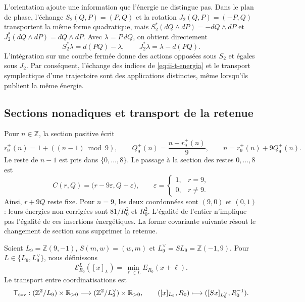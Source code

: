 L’orientation ajoute une information que l’énergie ne distingue pas. Dans le plan
de phase, l’échange \(S_2(Q,P)=(P,Q)\) et la rotation
\(J_2(Q,P)=(-P,Q)\) transportent la même forme quadratique, mais
\(S_2^*(dQ\wedge dP)=-dQ\wedge dP\) et
\(J_2^*(dQ\wedge dP)=dQ\wedge dP\). Avec
\(\lambda=P\,dQ\), on obtient directement
\[
 S_2^*\lambda=d(PQ)-\lambda,\qquad
 J_2^*\lambda=\lambda-d(PQ).
\]
L’intégration sur une courbe fermée donne des actions opposées sous \(S_2\)
et égales sous \(J_2\). Par conséquent, l’échange des indices de
\eqref{eq:ii-t-energia} et le transport symplectique d’une trajectoire
sont des applications distinctes, même lorsqu’ils publient la même énergie.

\subsection{Sections nonadiques et transport de la retenue}

Pour \(n\in\mathbb Z\), la section positive écrit
\[
 r_9^+(n)=1+((n-1)\bmod9),\qquad
 Q_9^+(n)=\frac{n-r_9^+(n)}9,\qquad n=r_9^+(n)+9Q_9^+(n).
\]
Le reste de \(n-1\) est pris dans \(\{0,\ldots,8\}\). Le passage à
la section des restes \(0,\ldots,8\) est
\begin{equation}
 C(r,Q)=\bigl(r-9\varepsilon,Q+\varepsilon\bigr),\qquad
 \varepsilon=\begin{cases}1,&r=9,\\0,&r\ne9.\end{cases}
 \label{eq:ii-t-acarreo}
\end{equation}
Ainsi, \(r+9Q\) reste fixe. Pour \(n=9\), les deux coordonnées
sont \((9,0)\) et \((0,1)\) : leurs énergies non corrigées sont
\(81/R_0^2\) et \(R_0^2\). L’égalité de l’entier n’implique pas
l’égalité de ces insertions énergétiques. La forme covariante suivante
résout le changement de section sans supprimer la retenue.

\begin{definition}
\label{def:ii-t-cociente}
Soient \(L_9=\mathbb Z(9,-1)\), \(S(m,w)=(w,m)\) et
\(L_9^\vee=SL_9=\mathbb Z(-1,9)\). Pour
\(L\in\{L_9,L_9^\vee\}\), nous définissons
\[
 \mathcal E_{R_0}^{L}([x]_L)
 =\min_{\ell\in L}E_{R_0}(x+\ell).
\]
Le transport entre coordinatisations est
\[
 \mathsf T_{\rm cov}:
 (\mathbb Z^2/L_9)\times\mathbb R_{>0}
 \longrightarrow
 (\mathbb Z^2/L_9^\vee)\times\mathbb R_{>0},\qquad
 ([x]_{L_9},R_0)\longmapsto([Sx]_{L_9^\vee},R_0^{-1}).
\]
\end{definition}

